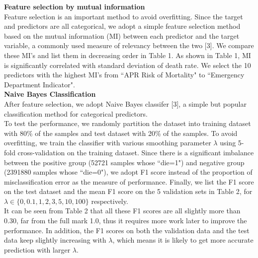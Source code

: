 \documentclass[a4paper]{article}
\begin{document}
\noindent
\textbf{\large Feature selection by mutual information\\}
\indent
Feature selection is an important method to avoid overfitting. Since the target and predictors are all categorical, we adopt a simple feature selection method based on the mutual information (MI) between each predictor and the target variable, a commonly used measure of relevancy between the two [3]. We compare these MI's and list them in decreasing order in Table 1. As shown in Table 1, MI is significantly correlated with standard deviation of death rate. We select the 10 predictors with the highest MI's from ``APR Risk of Mortality" to ``Emergency Department Indicator". \\

\noindent
\textbf{\large Naive Bayes Classification\\}
\indent
After feature selection, we adopt Naive Bayes classifer [3], a simple but popular classification method for categorical predictors. \\
\indent
To test the performance, we randomly partition the dataset into training dataset with 80\% of the samples and test dataset with 20\% of the samples. To avoid overfitting, we train the classifier with various smoothing parameter $\lambda$ using 5-fold cross-validation on the training dataset. Since there is a significant imbalance between the positive group (52721 samples whose ``die=1") and negative group (2391880 samples whose ``die=0"), we adopt F1 score instead of the proportion of misclassification error as the measure of performance. Finally, we list the F1 score on the test dataset and the mean F1 score on the 5 validation sets in Table 2, for $\lambda \in \{0,0.1,1,2,3,5,10,100\}$ respectively.\\
\indent
It can be seen from Table 2 that all these F1 scores are all slightly more than 0.30, far from the full mark 1.0, thus it requires more work later to improve the performance. In addition, the F1 scores on both the validation data and the test data keep slightly increasing with $\lambda$, which means it is likely to get more accurate prediction with larger $\lambda$.\\
\end{document}
